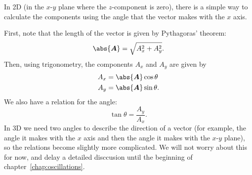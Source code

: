 \documentclass[../classical_mechanics.tex]{subfiles}
\begin{document}
            In 2D (in the $x$-$y$ plane where the $z$-component is zero), there is a simple way to calculate the components using the angle that the vector makes with the $x$ axis.
            \begin{figure}[H]
                \centering
            \end{figure}
            First, note that the length of the vector is given by Pythagoras' theorem:
            \begin{equation}\label{eq:2d-polar-length}
                \abs{\vec{A}}=\sqrt{A_x^2+A_y^2}.
            \end{equation}
            Then, using trigonometry, the components $A_x$ and $A_y$ are given by
            \begin{align}
                A_x&=\abs{\vec{A}}\cos\theta\label{eq:2d-polar-x-component}\\
                A_y&=\abs{\vec{A}}\sin\theta\label{eq:2d-polar-y-component}.
            \end{align}
            We also have a relation for the angle:
            \begin{equation}
                \tan\theta=\frac{A_y}{A_x}\label{eq:2d-polar-theta}.
            \end{equation}
            In 3D we need two angles to describe the direction of a vector (for example, the angle it makes with the $x$ axis and then the angle it makes with the $x$-$y$ plane), so the relations become slightly more complicated.
            We will not worry about this for now, and delay a detailed disccusion until the beginning of chapter~\ref{chap:oscillations}.
\end{document}
